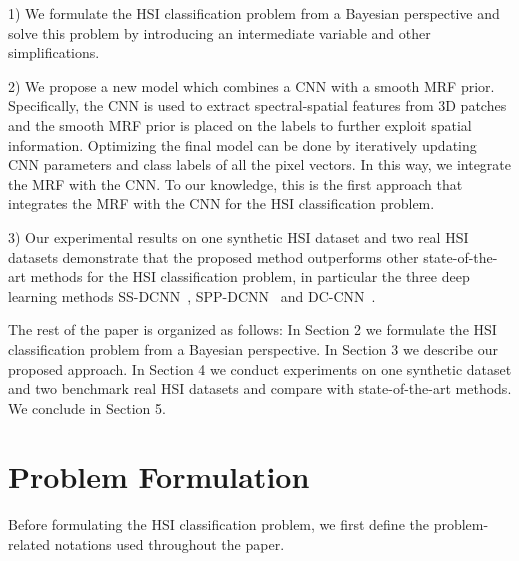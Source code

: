 \documentclass[journal]{IEEEtran}
\begin{document}
	1) We formulate the HSI {{classification}} problem from a Bayesian perspective and solve this problem by introducing an intermediate variable and other simplifications.
	
	2) {{We propose a new model which combines a CNN with a smooth MRF prior. Specifically, the CNN is used to extract spectral-spatial features from 3D patches and the smooth MRF prior is placed on the labels to further exploit spatial information. Optimizing the final model can be done by iteratively updating CNN parameters and class labels of all the pixel vectors. In this way, we integrate the MRF with the CNN. To our knowledge, this is the first approach that integrates the MRF with the CNN for the HSI classification problem.}}
	
	3) Our experimental results on one synthetic HSI dataset and two real HSI datasets demonstrate that the proposed method outperforms other state-of-the-art methods for the HSI {{classification}} problem, in particular the three deep learning methods SS-DCNN~\cite{yue2015spectral}, SPP-DCNN~\cite{yue2016deep} and DC-CNN~\cite{zhang2017spectral}.
	
	The rest of the paper is organized as follows: In Section 2 we formulate the HSI {{classification}} problem from a Bayesian perspective. In Section 3 we describe our proposed approach. In Section 4 we conduct experiments on one synthetic dataset and two benchmark real HSI datasets and compare with state-of-the-art methods. We conclude in Section 5. 
	
	\section{Problem Formulation}
	Before formulating the HSI {{classification}} problem, we first define the problem-related notations used throughout the paper.
	
\end{document}
